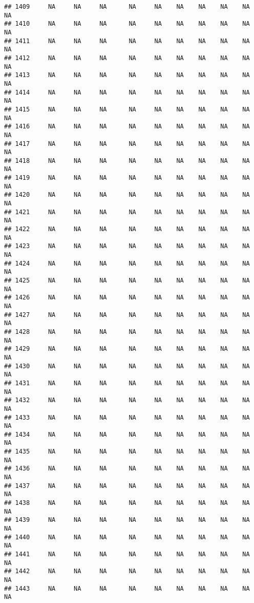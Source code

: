 \documentclass{article}\usepackage{graphicx, color}
\makeatletter
\newenvironment{kframe}{%
 \def\at@end@of@kframe{}%
 \ifinner\ifhmode%
  \def\at@end@of@kframe{\end{minipage}}%
  \begin{minipage}{\columnwidth}%
 \fi\fi%
 \def\FrameCommand##1{\hskip\@totalleftmargin \hskip-\fboxsep
 \colorbox{shadecolor}{##1}\hskip-\fboxsep
     \hskip-\linewidth \hskip-\@totalleftmargin \hskip\columnwidth}%
 \MakeFramed {\advance\hsize-\width
   \@totalleftmargin\z@ \linewidth\hsize
   \@setminipage}}%
 {\par\unskip\endMakeFramed%
 \at@end@of@kframe}
\newenvironment{knitrout}{}{} %
\makeatother
\begin{document}
\begin{knitrout}
\begin{kframe}
\begin{verbatim}
## 1409     NA     NA     NA      NA     NA    NA    NA    NA    NA     NA
## 1410     NA     NA     NA      NA     NA    NA    NA    NA    NA     NA
## 1411     NA     NA     NA      NA     NA    NA    NA    NA    NA     NA
## 1412     NA     NA     NA      NA     NA    NA    NA    NA    NA     NA
## 1413     NA     NA     NA      NA     NA    NA    NA    NA    NA     NA
## 1414     NA     NA     NA      NA     NA    NA    NA    NA    NA     NA
## 1415     NA     NA     NA      NA     NA    NA    NA    NA    NA     NA
## 1416     NA     NA     NA      NA     NA    NA    NA    NA    NA     NA
## 1417     NA     NA     NA      NA     NA    NA    NA    NA    NA     NA
## 1418     NA     NA     NA      NA     NA    NA    NA    NA    NA     NA
## 1419     NA     NA     NA      NA     NA    NA    NA    NA    NA     NA
## 1420     NA     NA     NA      NA     NA    NA    NA    NA    NA     NA
## 1421     NA     NA     NA      NA     NA    NA    NA    NA    NA     NA
## 1422     NA     NA     NA      NA     NA    NA    NA    NA    NA     NA
## 1423     NA     NA     NA      NA     NA    NA    NA    NA    NA     NA
## 1424     NA     NA     NA      NA     NA    NA    NA    NA    NA     NA
## 1425     NA     NA     NA      NA     NA    NA    NA    NA    NA     NA
## 1426     NA     NA     NA      NA     NA    NA    NA    NA    NA     NA
## 1427     NA     NA     NA      NA     NA    NA    NA    NA    NA     NA
## 1428     NA     NA     NA      NA     NA    NA    NA    NA    NA     NA
## 1429     NA     NA     NA      NA     NA    NA    NA    NA    NA     NA
## 1430     NA     NA     NA      NA     NA    NA    NA    NA    NA     NA
## 1431     NA     NA     NA      NA     NA    NA    NA    NA    NA     NA
## 1432     NA     NA     NA      NA     NA    NA    NA    NA    NA     NA
## 1433     NA     NA     NA      NA     NA    NA    NA    NA    NA     NA
## 1434     NA     NA     NA      NA     NA    NA    NA    NA    NA     NA
## 1435     NA     NA     NA      NA     NA    NA    NA    NA    NA     NA
## 1436     NA     NA     NA      NA     NA    NA    NA    NA    NA     NA
## 1437     NA     NA     NA      NA     NA    NA    NA    NA    NA     NA
## 1438     NA     NA     NA      NA     NA    NA    NA    NA    NA     NA
## 1439     NA     NA     NA      NA     NA    NA    NA    NA    NA     NA
## 1440     NA     NA     NA      NA     NA    NA    NA    NA    NA     NA
## 1441     NA     NA     NA      NA     NA    NA    NA    NA    NA     NA
## 1442     NA     NA     NA      NA     NA    NA    NA    NA    NA     NA
## 1443     NA     NA     NA      NA     NA    NA    NA    NA    NA     NA

\end{verbatim}
\end{kframe}
\end{knitrout}
\end{document}
